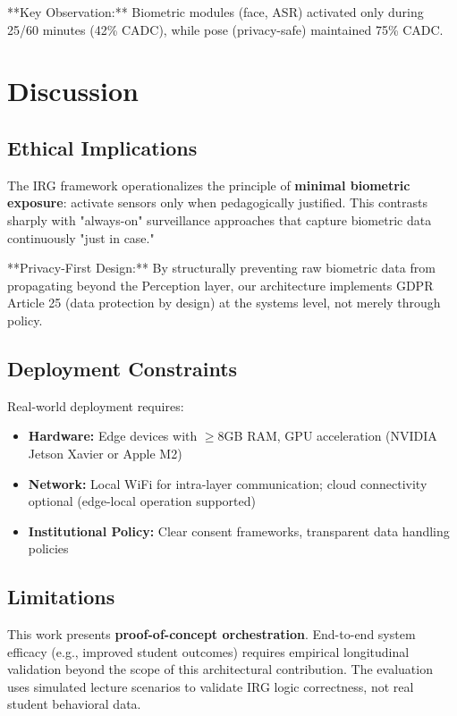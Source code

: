 \documentclass[conference]{IEEEtran}
\begin{document}
**Key Observation:** Biometric modules (face, ASR) activated only during 25/60 minutes (42\% CADC), while pose (privacy-safe) maintained 75\% CADC.

\section{Discussion}

\subsection{Ethical Implications}
The IRG framework operationalizes the principle of \textbf{minimal biometric exposure}: activate sensors only when pedagogically justified. This contrasts sharply with "always-on" surveillance approaches that capture biometric data continuously "just in case."

**Privacy-First Design:** By structurally preventing raw biometric data from propagating beyond the Perception layer, our architecture implements GDPR Article 25 (data protection by design) at the systems level, not merely through policy.

\subsection{Deployment Constraints}
Real-world deployment requires:
\begin{itemize}
    \item \textbf{Hardware:} Edge devices with $\geq$8GB RAM, GPU acceleration (NVIDIA Jetson Xavier or Apple M2)
    \item \textbf{Network:} Local WiFi for intra-layer communication; cloud connectivity optional (edge-local operation supported)
    \item \textbf{Institutional Policy:} Clear consent frameworks, transparent data handling policies
\end{itemize}

\subsection{Limitations}
This work presents \textbf{proof-of-concept orchestration}. End-to-end system efficacy (e.g., improved student outcomes) requires empirical longitudinal validation beyond the scope of this architectural contribution. The evaluation uses simulated lecture scenarios to validate IRG logic correctness, not real student behavioral data.
\end{document}
